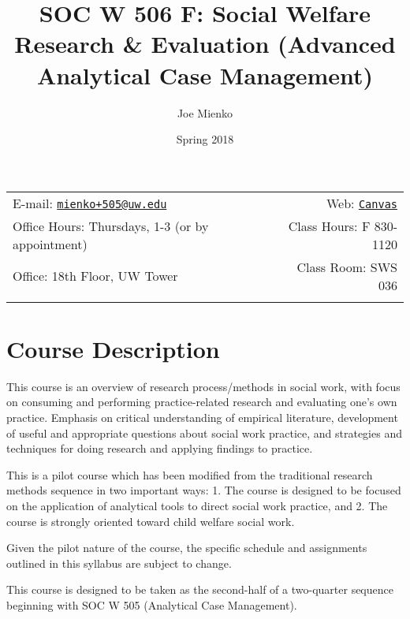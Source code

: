 \documentclass[11pt,]{article}
\title{SOC W 506 F: Social Welfare Research \& Evaluation (Advanced Analytical
Case Management)}
\author{Joe Mienko}
\date{Spring 2018}
\begin{document}
  

		\maketitle
		
	
		\thispagestyle{firststyle}



	\noindent \begin{tabular*}{\textwidth}{ @{\extracolsep{\fill}} lr @{\extracolsep{\fill}}}


E-mail: \texttt{\href{mailto:mienko+505@uw.edu}{\nolinkurl{mienko+505@uw.edu}}} & Web: \href{http://Canvas}{\tt Canvas}\\
Office Hours: Thursdays, 1-3 (or by appointment)  &  Class Hours: F 830-1120\\
Office: 18th Floor, UW Tower  & Class Room: SWS 036\\
	&  \\
	\hline
	\end{tabular*}
	
\vspace{2mm}
	


\section{Course Description}\label{course-description}

This course is an overview of research process/methods in social work,
with focus on consuming and performing practice-related research and
evaluating one's own practice. Emphasis on critical understanding of
empirical literature, development of useful and appropriate questions
about social work practice, and strategies and techniques for doing
research and applying findings to practice.

This is a pilot course which has been modified from the traditional
research methods sequence in two important ways: 1. The course is
designed to be focused on the application of analytical tools to direct
social work practice, and 2. The course is strongly oriented toward
child welfare social work.

Given the pilot nature of the course, the specific schedule and
assignments outlined in this syllabus are subject to change.

This course is designed to be taken as the second-half of a two-quarter
sequence beginning with SOC W 505 (Analytical Case Management).
\end{document}
